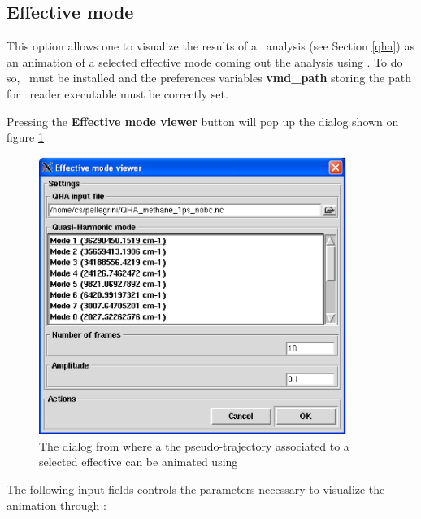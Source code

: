 \documentclass[a4paper,11pt]{report}
\begin{document}
\subsection{Effective mode}
\label{effective_mode}
This option allows one to visualize the results of a \QHA\ analysis (see Section \ref{qha}) as an animation of a selected 
effective mode coming out the analysis using \VMD . To do so, \VMD\ must be installed and the preferences variables 
\textbf{vmd\_path} storing the path for \VMD\ reader executable must be correctly set. 

Pressing the \textbf{Effective mode viewer} button will pop up the dialog shown on figure \ref{fig:effective_mode_viewer}
\begin{figure}[h!]
\begin{center}
\includegraphics[width=10cm]{Figures/effective_mode_viewer.eps}
\end{center}
\caption[The effective mode viewer dialog]{The dialog from where a the pseudo-trajectory associated to a selected effective 
can be animated using \VMD }
\label{fig:effective_mode_viewer}
\end{figure}   

The following input fields controls the parameters necessary to visualize the animation through \VMD :
\end{document}
